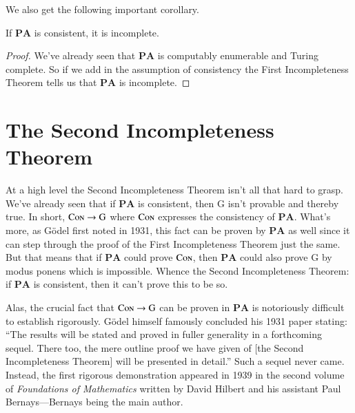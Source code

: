 \documentclass{article}
\theoremstyle{customstyle}
\newenvironment{prf}{\begin{mdframed}[skipabove=5pt, skipbelow=0pt, backgroundcolor=Gray!10, topline=false, bottomline=false, leftline=false, rightline=false]\begin{proof}}{\end{proof}\end{mdframed}}
\DeclareMathOperator{\Con}{\textsc{Con}}
\newcommand{\PA}{\mathbf{PA}}
\begin{document}
We also get the following important corollary.

\begin{corollary}
If $\PA$ is consistent, it is incomplete.
\end{corollary}

\begin{prf}
We've already seen that $\PA$ is computably enumerable and Turing complete. So if we add in the assumption of consistency the First Incompleteness Theorem tells us that $\PA$ is incomplete.
\end{prf}

\section{The Second Incompleteness Theorem}

At a high level the Second Incompleteness Theorem isn't all that hard to grasp. We've already seen that if $\PA$ is consistent, then $\mathrm{G}$ isn't provable and thereby true. In short, $\Con \rightarrow \mathrm{G}$ where $\Con$ expresses the consistency of $\PA$. What's more, as Gödel first noted in 1931, this fact can be proven by $\PA$ as well since it can step through the proof of the First Incompleteness Theorem just the same. But that means that if $\PA$ could prove $\Con$, then $\PA$ could also prove $\mathrm{G}$ by modus ponens which is impossible. Whence the Second Incompleteness Theorem: if $\PA$ is consistent, then it can't prove this to be so.

Alas, the crucial fact that $\Con \rightarrow \mathrm{G}$ can be proven in $\PA$ is notoriously difficult to establish rigorously. Gödel himself famously concluded his 1931 paper stating: ``The results will be stated and proved in fuller generality in a forthcoming sequel. There too, the mere outline proof we have given of [the Second Incompleteness Theorem] will be presented in detail.'' Such a sequel never came. Instead, the first rigorous demonstration appeared in 1939 in the second volume of \textit{Foundations of Mathematics} written by David Hilbert and his assistant Paul Bernays---Bernays being the main author.
\end{document}
